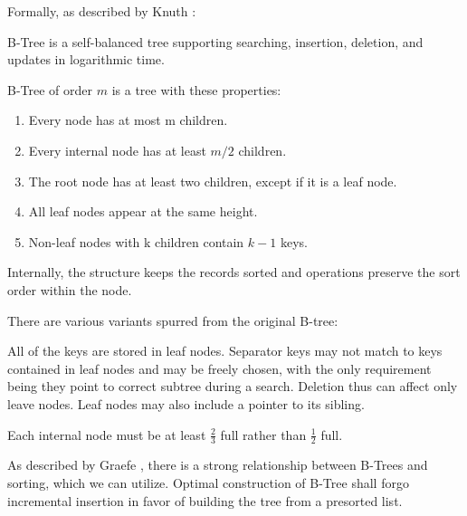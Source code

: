 Formally, as described by Knuth \cite{knuth1998art}:

\begin{definition}[B-Tree]\label{def:btree}
  B-Tree is a self-balanced tree supporting searching, insertion, deletion, and updates in logarithmic time.

  B-Tree of order $m$ is a tree with these properties:
  \begin{enumerate}
    \item Every node has at most m children.
    \item Every internal node has at least $m/2$ children.
    \item The root node has at least two children, except if it is a leaf node.
    \item All leaf nodes appear at the same height.
    \item Non-leaf nodes with k children contain $k - 1$ keys.
  \end{enumerate}
\end{definition}

Internally, the structure keeps the records sorted and operations preserve the sort order within the node.

There are various variants spurred from the original B-tree:

\begin{definition}[B$^+$Tree]\label{def:bplustree}
  All of the keys are stored in leaf nodes. Separator keys may not match to keys contained in leaf nodes and may be freely chosen, with the only requirement being they point to correct subtree during a search. Deletion thus can affect only leave nodes. Leaf nodes may also include a pointer to its sibling.
\end{definition}

\begin{definition}\label{def:bstartree}
  Each internal node must be at least $\frac{2}{3}$ full rather than $\frac{1}{2}$ full.
\end{definition}

As described by Graefe \cite{goetz-tech}, there is a strong relationship between B-Trees and sorting, which we can utilize. Optimal construction of B-Tree shall forgo incremental insertion in favor of building the tree from a presorted list.